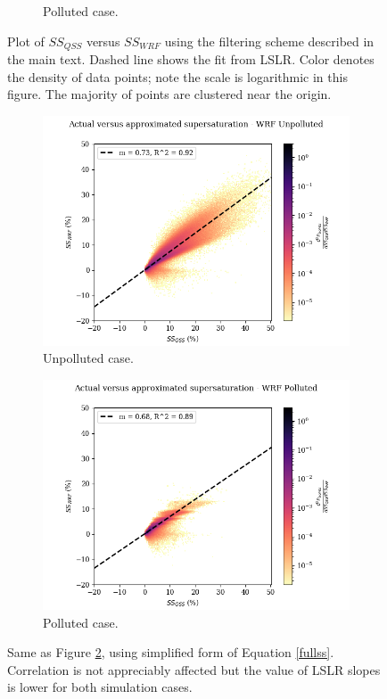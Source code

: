 \documentclass{article}
\begin{document}
\begin{figure}[ht]
\begin{subfigure}{0.7\textwidth}
		\caption{Polluted case.}
		\label{wrfvsqsspoll}
	\end{subfigure}
	\caption{Plot of $SS_{QSS}$ versus $SS_{WRF}$ using the filtering scheme described in the main text. Dashed line shows the fit from LSLR. Color denotes the density of data points; note the scale is logarithmic in this figure. The majority of points are clustered near the origin.}
	\label{wrfvsqss}
\end{figure}

\begin{figure}[ht]
	\centering
	\begin{subfigure}{0.7\textwidth}
		\includegraphics[width=\textwidth]{wrf/simpleqss_heatmap_ss_qss_vs_ss_wrf_Unpolluted_figure.png}
		\caption{Unpolluted case.}
		\label{simpleqsswrfvsqssunpoll}
	\end{subfigure}
	\begin{subfigure}{0.7\textwidth}
		\includegraphics[width=\textwidth]{wrf/simpleqss_heatmap_ss_qss_vs_ss_wrf_Polluted_figure.png}
		\caption{Polluted case.}
		\label{simpleqsswrfvsqsspoll}
	\end{subfigure}
	\caption{Same as Figure \ref{wrfvsqss}, using simplified form of Equation \ref{fullss}. Correlation is not appreciably affected but the value of LSLR slopes is lower for both simulation cases.}
	\label{simpleqsswrfvsqss}
\end{figure}
\end{document}
